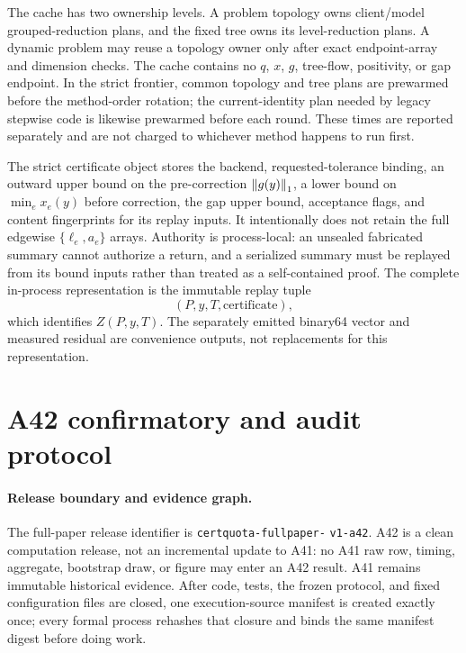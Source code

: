The cache has two ownership levels.  A problem topology owns client/model
grouped-reduction plans, and the fixed tree owns its level-reduction plans.  A
dynamic problem may reuse a topology owner only after exact endpoint-array and
dimension checks.  The cache contains no $q$, $x$, $g$, tree-flow, positivity,
or gap endpoint.  In the strict frontier, common topology and tree plans are
prewarmed before the method-order rotation; the current-identity plan needed by
legacy stepwise code is likewise prewarmed before each round.  These times are
reported separately and are not charged to whichever method happens to run
first.

The strict certificate object stores the backend, requested-tolerance binding,
an outward upper bound on the pre-correction $\left\lVert g(y)\right\rVert_1$, a lower bound on
$\min_e x_e(y)$ before correction, the gap upper bound, acceptance flags, and
content fingerprints for its replay inputs.  It intentionally does not retain
the full edgewise $\{\ell_e,a_e\}$ arrays.  Authority is process-local: an
unsealed fabricated summary cannot authorize a return, and a serialized summary
must be replayed from its bound inputs rather than treated as a self-contained
proof.  The complete in-process representation is the immutable replay tuple
\begin{equation}
 (P,y,T,\text{certificate}),
\end{equation}
which identifies $Z(P,y,T)$.  The separately emitted binary64 vector and measured
residual are convenience outputs, not replacements for this representation.

\section{A42 confirmatory and audit protocol}
\label{app:protocol}
\small

\paragraph{Release boundary and evidence graph.}
The full-paper release identifier is
\texttt{certquota-}\allowbreak\texttt{fullpaper-}\allowbreak
\texttt{v1-a42}.  A42 is a clean computation release, not an
incremental update to A41: no A41 raw row, timing, aggregate, bootstrap draw, or
figure may enter an A42 result.  A41 remains immutable historical evidence.
After code, tests, the frozen protocol, and fixed configuration files are
closed, one execution-source manifest is created exactly once; every formal
process rehashes that closure and binds the same manifest digest before doing
work.

